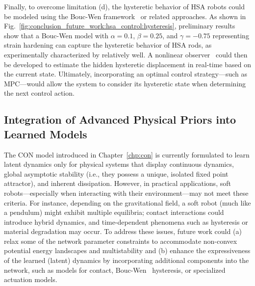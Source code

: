 Finally, to overcome limitation (d), the hysteretic behavior of \gls{HSA} robots could be modeled using the Bouc-Wen framework~\citep{bouc1967forced, wen1976method} or related approaches. As shown in Fig.~\ref{fig:conclusion_future_work:hsa_control:hysteresis}, preliminary results show that a Bouc-Wen model with $\alpha=0.1$, $\beta=0.25$, and $\gamma=-0.75$ representing strain hardening can capture the hysteretic behavior of \gls{HSA} rods, as experimentally characterized by \citet{truby2021recipe} relatively well.
A nonlinear observer~\citep{shao2023model} could then be developed to estimate the hidden hysteretic displacement in real-time based on the current state. Ultimately, incorporating an optimal control strategy—such as \gls{MPC}—would allow the system to consider its hysteretic state when determining the next control action.

\subsection{Integration of Advanced Physical Priors into Learned Models}
The \gls{CON} model introduced in Chapter~\ref{chp:con} is currently formulated to learn latent dynamics only for physical systems that display continuous dynamics, global asymptotic stability (i.e., they possess a unique, isolated fixed point attractor), and inherent dissipation. However, in practical applications, soft robots—especially when interacting with their environment—may not meet these criteria. For instance, depending on the gravitational field, a soft robot (much like a pendulum) might exhibit multiple equilibria; contact interactions could introduce hybrid dynamics, and time-dependent phenomena such as hysteresis or material degradation may occur. To address these issues, future work could (a) relax some of the network parameter constraints to accommodate non-convex potential energy landscapes and multistability and (b) enhance the expressiveness of the learned (latent) dynamics by incorporating additional components into the network, such as models for contact, Bouc-Wen~\citep{bouc1967forced, wen1976method} hysteresis, or specialized actuation models.

